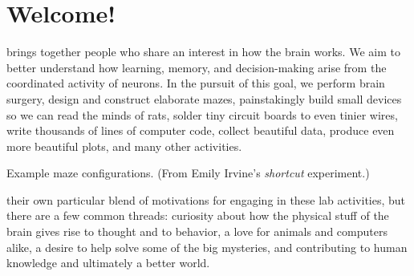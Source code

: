 \documentclass{tufte-book}
\makeatletter
\newenvironment{chapquote}[2][2em]
  {\setlength{\@tempdima}{#1}%
   \def\chapquote@author{#2}%
   \parshape 1 \@tempdima \dimexpr\textwidth-2\@tempdima\relax%
   \itshape}
  {\par\normalfont\hfill--\ \chapquote@author\hspace*{\@tempdima}\par\bigskip}
\makeatother
\begin{document}
\setcounter{tocdepth}{1}
\tableofcontents

\chapter{Welcome!}


 brings together people who share an
interest in how the brain works. We aim to better understand how
learning, memory, and decision-making arise from the coordinated
activity of neurons. In the pursuit of this goal, we perform brain
surgery, design and construct elaborate mazes, painstakingly build small
devices so we can read the minds of rats, solder tiny circuit boards
to even tinier wires, write thousands of lines of computer code,
collect beautiful data, produce even more beautiful plots, and many
other activities.

\begin{marginfigure}[-4cm]
\caption{Example maze configurations. (From Emily Irvine's {\it
    shortcut} experiment.)}
\label{fig:shortcut}
\end{marginfigure}

 their own particular blend of
motivations for engaging in these lab activities, but there are a few
common threads: curiosity about how the physical stuff of the brain
gives rise to thought and to behavior, a love for animals and
computers alike, a desire to help solve some of the big mysteries, and
contributing to human knowledge and ultimately a better world.
\end{document}
